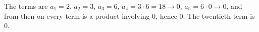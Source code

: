 The terms are $a_1=2$, $a_2=3$, $a_3=6$, $a_4=3\cdot6=18\to0$, $a_5=6\cdot0\to0$, and from then on every term is a product involving $0$, hence $0$. The twentieth term is $\boxed{0}$.
